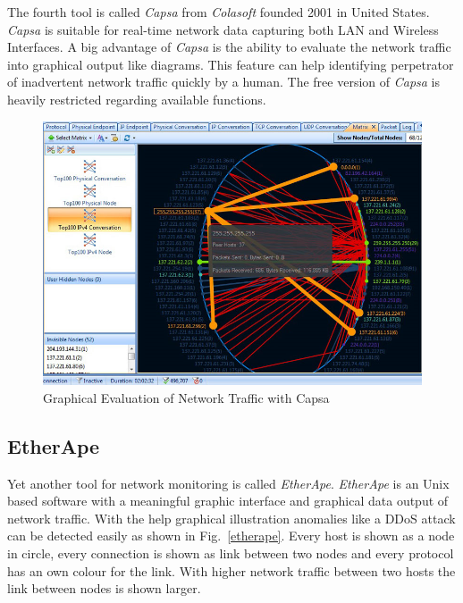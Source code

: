 \documentclass[conference]{IEEEtran}
\begin{document}
The fourth tool is called \textit{Capsa} from \textit{Colasoft} founded 2001 in United States. \textit{Capsa} is suitable for real-time network data capturing both LAN and Wireless Interfaces. A big advantage of \textit{Capsa} is the ability to evaluate the network traffic into graphical output like diagrams. This feature can help identifying perpetrator of inadvertent network traffic quickly by a human. The free version of \textit{Capsa} is heavily restricted regarding available functions. 

\begin{figure}[htbp]
\centerline{\includegraphics[scale=0.30]{capsa.png}}
\caption{Graphical Evaluation of Network Traffic with Capsa \cite{firewallcx}}
\label{capsa}
\end{figure}

\subsection*{EtherApe}

Yet another tool for network monitoring is called \textit{EtherApe}. \textit{EtherApe} is an Unix based software with a meaningful graphic interface and graphical data output of network traffic. With the help graphical illustration anomalies like a DDoS attack can be detected easily as shown in Fig.~\ref{etherape}. Every host is shown as a node in circle, every connection is shown as link between two nodes and every protocol has an own colour for the link. With higher network traffic between two hosts the link between nodes is shown larger.
\end{document}
